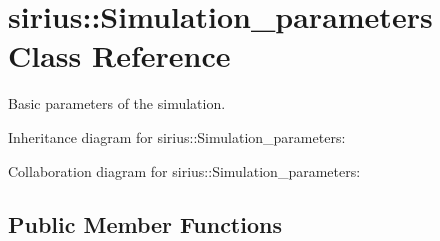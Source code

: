 \hypertarget{classsirius_1_1_simulation__parameters}{}\section{sirius\+:\+:Simulation\+\_\+parameters Class Reference}
\label{classsirius_1_1_simulation__parameters}


Basic parameters of the simulation.  




Inheritance diagram for sirius\+:\+:Simulation\+\_\+parameters\+:


Collaboration diagram for sirius\+:\+:Simulation\+\_\+parameters\+:
\subsection*{Public Member Functions}
